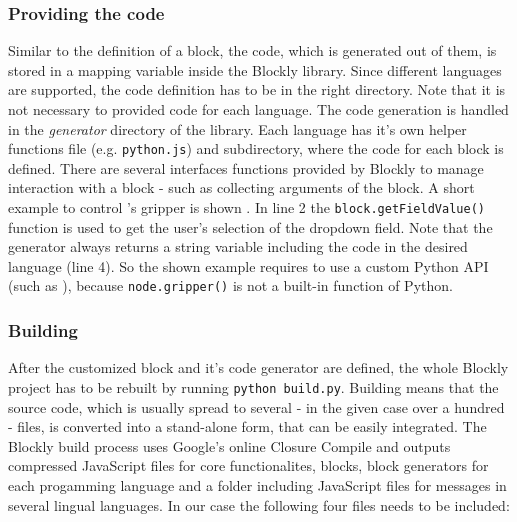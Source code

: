 \subsubsection{Providing the code}
Similar to the definition of a block, the code, which is generated out of them, is stored in a mapping variable inside the Blockly library. Since different languages are supported, the code definition has to be in the right directory. Note that it is not necessary to provided code for each language. The code generation is handled in the \textit{generator} directory of the library. Each language has it's own helper functions file (e.g. \lstinline!python.js!) and subdirectory, where the code for each block is defined. There are several interfaces functions provided by Blockly to manage interaction with a block - such as collecting arguments of the block. A short example to control \hobbit{}'s gripper is shown . In line 2 the \lstinline!block.getFieldValue()! function is used to get the user's selection of the dropdown field. Note that the generator always returns a string variable including the code in the desired language (line 4). So the shown example requires to use a custom Python API (such as ), because \lstinline!node.gripper()! is not a built-in function of Python. \\

\begin{figure}[htbp]
	
\end{figure}

\subsubsection{Building}
After the customized block and it's code generator are defined, the whole Blockly project has to be rebuilt by running \lstinline!python build.py!. Building means that the source code, which is usually spread to several - in the given case over a hundred - files, is converted into a stand-alone form, that can be easily integrated. The Blockly build process uses Google's online Closure Compile and outputs compressed JavaScript files for core functionalites, blocks, block generators for each progamming language and a folder including JavaScript files for messages in several lingual languages. In our case the following four files needs to be included:

